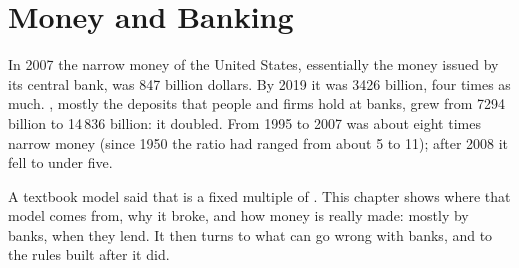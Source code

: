 \chapter{Money and Banking}\label{ch:g11:money-and-banking}

In 2007 the narrow money of the United States, essentially the money issued by its central bank, was 847 billion dollars. By 2019 it was 3426 billion, four times as
much. , mostly the deposits that people and firms hold at banks, grew from 7294 billion to 14\,836 billion: it doubled. From 1995 to 2007  was
about eight times narrow money (since 1950 the ratio had ranged from about 5 to 11); after 2008 it fell to under five.

A textbook model said that  is a fixed multiple of . This chapter shows where that model comes from, why it broke, and how money is really
made: mostly by banks, when they lend. It then turns to what can go wrong with banks, and to the rules built after it did.

